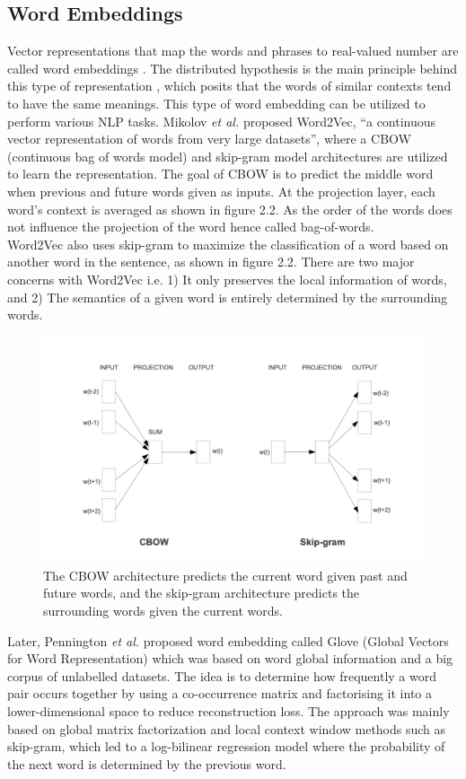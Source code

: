 \documentclass[%
	BCOR=8mm, %
	DIV=12,
	toc=bibliography, %
	toc=listof, %
	oneside, %
	egregdoesnotlikesansseriftitles, %
	]{scrbook}
\begin{document}
\subsection{Word Embeddings}
\label{subsection:wordembeddings}
Vector representations that map the words and phrases to real-valued number are called word embeddings \cite{almeida_word_2019-2}. The distributed hypothesis is the main principle behind this type of representation \cite{harris_distributional_1954}, which posits that the words of similar contexts tend to have the same meanings. This type of word embedding can be utilized to perform various NLP tasks. Mikolov \textit{et al.} \cite{mikolov_efficient_2013} proposed Word2Vec, ``a continuous vector representation of words from very large datasets'', where a CBOW (continuous bag of words model) and skip-gram model architectures are utilized to learn the representation. The goal of CBOW is to predict the middle word when previous and future words given as inputs. At the projection layer, each word's context is averaged as shown in figure 2.2. As the order of the words does not influence the projection of the word hence called bag-of-words. \\
Word2Vec also uses skip-gram to maximize the classification of a word based on another word in the  sentence, as shown in figure 2.2.  There are two major concerns with Word2Vec i.e. 1) It only preserves the local information of words,  and 2) The semantics of a given word is entirely determined by the surrounding words.
\begin{figure}[h!]
    \centering
    \includegraphics[width=0.65\linewidth]{img/cbowandskip.png}
    \caption[Working diagram of CBOW and Skip-gram.]{ The CBOW architecture predicts the current word given past and future words, and the skip-gram architecture predicts the surrounding words given the current words.}
    \label{fig:cbow}
\end{figure}
Later, Pennington \textit{et al.} \cite{pennington_glove_2014} proposed word embedding called Glove (Global Vectors for Word Representation) which was based on word global information and a big corpus of unlabelled datasets. The idea is to determine how frequently a word pair occurs together by using a co-occurrence matrix and factorising it into a lower-dimensional space to reduce reconstruction loss. The approach was mainly based on global matrix factorization and local context window methods such as skip-gram, which led to a log-bilinear regression model where the probability of the next word is determined by the previous word.\\
\end{document}
